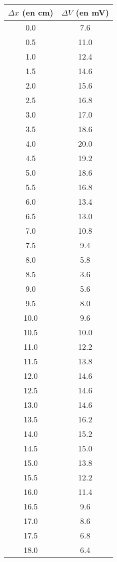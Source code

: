 \documentclass{scrartcl}
\begin{document}
		\bigskip
		\begin{tabular}{|c|c|}
			\hline $\Delta x$ (en cm) & $\Delta V$ (en mV) \\
			\hline 0.0 & 7.6 \\
			\hline 0.5 & 11.0 \\
			\hline 1.0 & 12.4 \\
			\hline 1.5 & 14.6 \\
			\hline 2.0 & 15.6 \\
			\hline 2.5 & 16.8 \\
			\hline 3.0 & 17.0 \\
			\hline 3.5 & 18.6 \\
			\hline 4.0 & 20.0 \\
			\hline 4.5 & 19.2 \\
			\hline 5.0 & 18.6 \\
			\hline 5.5 & 16.8 \\
			\hline 6.0 & 13.4 \\
			\hline 6.5 & 13.0 \\
			\hline 7.0 & 10.8 \\
			\hline 7.5 & 9.4 \\
			\hline 8.0 & 5.8 \\
			\hline 8.5 & 3.6 \\
			\hline 9.0 & 5.6 \\
			\hline 9.5 & 8.0 \\
			\hline 10.0 & 9.6 \\
			\hline 10.5 & 10.0 \\
			\hline 11.0 & 12.2 \\
			\hline 11.5 & 13.8 \\
			\hline 12.0 & 14.6 \\
			\hline 12.5 & 14.6 \\
			\hline 13.0 & 14.6 \\
			\hline 13.5 & 16.2 \\
			\hline 14.0 & 15.2 \\
			\hline 14.5 & 15.0 \\
			\hline 15.0 & 13.8 \\
			\hline 15.5 & 12.2 \\
			\hline 16.0 & 11.4 \\
			\hline 16.5 & 9.6 \\
			\hline 17.0 & 8.6 \\
			\hline 17.5 & 6.8 \\
			\hline 18.0 & 6.4 \\
			\hline
		\end{tabular}
\end{document}
